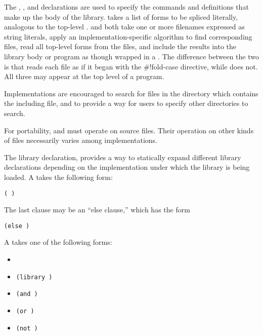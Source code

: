 The , , and  declarations are
used to specify the commands and definitions that make up the body of
the library.   takes a list of forms to be spliced
literally, analogous to the top-level .  
 and
 both take one or more filenames expressed as string literals,
apply an implementation-specific algorithm to find corresponding files,
read all top-level
forms from the files, and include the results into the library body or program as
though wrapped in a .
The difference between the two is that  reads each file
as if it began with the {\cf{}\#!fold-case} directive, while 
does not.
All three may appear at the top level of a program.

\begin{note}
Implementations are encouraged to search for files in the directory
which contains the including file, and to provide a way for users to
specify other directories to search.
\end{note}

\begin{note}
For portability,  and  must operate on source files.
Their operation on other kinds of files necessarily varies among
implementations.
\end{note}

The  library declaration,
provides a way to statically
expand different library declarations depending on the 
implementation under which the library is being loaded.  A
 takes the following form:

{\tt(  \dotsfoo)}

The last clause may be an ``else clause,'' which has the form

{\tt(else  \dotsfoo)}

A  takes one of the following forms:

\begin{itemize}
\item {\tt{}}
\item {\tt(library )}
\item {\tt(and  \dotsfoo)}
\item {\tt(or  \dotsfoo)}
\item {\tt(not )}
\end{itemize}


